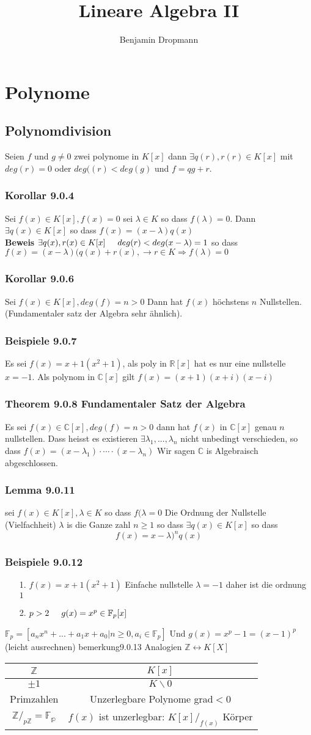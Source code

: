 \documentclass{article}
\title{Lineare Algebra II}
\author{Benjamin Dropmann}
\newcommand{\mspc}{\hspace{0.7cm}}
\newcommand{\korollar}[1]{\subsubsection*{Korollar {#1}}}
\newcommand{\beweis}{\\\textbf{Beweis }}
\newcommand{\beispiel}[1]{\subsubsection*{Beispiele {#1}}}
\newcommand{\theorem}[1]{\subsubsection*{Theorem {#1}}}
\newcommand{\lemma}[1]{\subsubsection*{Lemma {#1}}}
\begin{document}
\maketitle
\section*{Polynome}
\subsection*{Polynomdivision}
Seien $f$ und $g\ne0$ zwei polynome in $K[x]$ dann $\exists q(r), r(r)\in K[x]$ mit $deg(r)=0$ oder $deg((r)<deg(g)$ und $f=qg+r$.
\korollar{9.0.4} Sei $f(x)\in K[x],f(x)=0$ sei $\lambda\in K$ so dass $f(\lambda)=0$. Dann $\exists q(x)\in K[x]$ so dass $ f(x)=(x-\lambda)q(x)$
\beweis $\exists q(x),r(x)\in K[x] \hspace{0.5cm}deg(r)<deg(x-\lambda)=1$ so dass $f(x)=(x-\lambda)(q(x)+r(x), \rightarrow r\in K\Rightarrow f(\lambda)=0$
\korollar{9.0.6} Sei $f(x)\in K[x], deg(f)=n>0$ Dann hat $f(x)$ höchstens $n$ Nullstellen. (Fundamentaler satz der Algebra sehr ähnlich).
\beispiel{9.0.7} Es sei $f(x)=x+1(x^2+1)$, als poly in $\mathbb{R}[x]$ hat es nur eine nullstelle $x=-1$.
Als polynom in $\mathbb{C}[x]$ gilt $f(x)=(x+1)(x+i)(x-i)$
\theorem{9.0.8 Fundamentaler Satz der Algebra} Es sei $f(x)\in \mathbb{C}[x], deg(f)=n>0$ dann hat $f(x)$ in $\mathbb{C}[x]$ genau $n$ nullstellen. Dass heisst es existieren $\exists \lambda_1,...,\lambda_n$ nicht unbedingt verschieden, so dass $f(x)=(x-\lambda_1)\cdot\left.\right.\cdots\left.\right.\cdot(x-\lambda_n)$ Wir sagen $\mathbb{C}$ is Algebraisch abgeschlossen.
\lemma{9.0.11} sei $f(x)\in K[x], \lambda\in K$ so dass $f(\lambda=0$ Die Ordnung der Nullstelle (Vielfachheit) $\lambda$ is die Ganze zahl $n\ge1$ so dass $\exists q(x)\in K[x]$ so dass \[f(x)=x-\lambda)^nq(x)\]
\beispiel{9.0.12}\begin{itemize}
\item[1.]{$f(x)=x+1(x^2+1) $ Einfache nullstelle $\lambda=-1$ daher ist die ordnung $1$}
\item[2.]{$p>2\hspace{0.5cm}g(x)=x^p\in\mathbb{F}_p[x]\mspc$ }
\end{itemize}
$\mathbb{F}_p=[a_nx^n+...+a_1x+a_0|n\ge0,a_i\in\mathbb{F}_p]$ Und $g(x)=x^p-1=(x-1)^p$ (leicht ausrechnen)
bemerkung{9.0.13} Analogien $\mathbb{Z}\leftrightarrow K[X]$
\begin{center}
\begin{tabular}{c|c}
	$\mathbb{Z}$&$K[x]$\\\hline
	$\pm1$&$K\backslash 0$\\
	Primzahlen&Unzerlegbare Polynome grad$<$0\\
	$\mathbb{Z}/_{p\mathbb{Z}}=\mathbb{F_p}$&$f(x)$ ist unzerlegbar: $K[x]/_{f(x)}$ Körper
\end{tabular}
\end{center}
\end{document}
